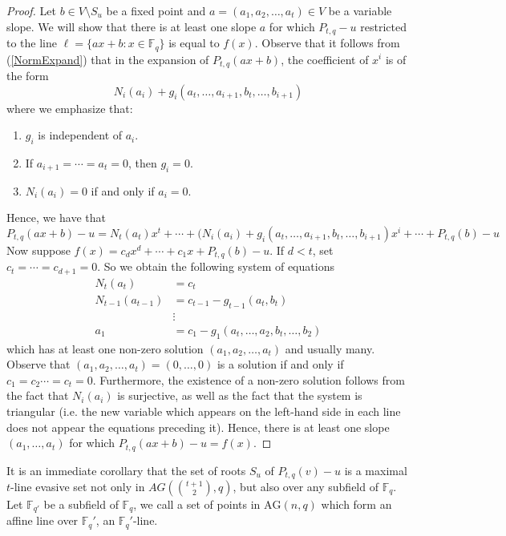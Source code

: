 \documentclass[12pt]{article}
\newcommand{\F}{\mathbb{F}}
\newcommand{\AG}{\text{AG}}
\begin{document}
\begin{proof}
Let $b \in V\setminus S_u$ be a fixed point and $a = (a_1, a_2, \dots, a_t)\in V$ be a variable slope. We will show that there is at least one slope $a$ for which $P_{t, q} - u$ restricted to the line $\ell = \{ax + b : x \in \F_q\}$ is equal to $f(x)$. Observe that it follows from (\ref{NormExpand}) that in the expansion of $P_{t, q}(ax + b)$,  the coefficient of $x^i$ is of the form 
    $$
    N_i(a_i) + g_i(a_{t}, \dots, a_{i + 1}, b_{t}, \dots, b_{i+1})
    $$
    where we emphasize that:
    \begin{enumerate}
        \item $g_i$ is independent of $a_i$.
        \item If $a_{i + 1} = \cdots =a_t = 0$, then $g_i = 0$.
        \item $N_i(a_i) = 0$ if and only if $a_i = 0$.
    \end{enumerate}
    Hence, we have that 
    \begin{equation}\label{Pexpand}
    P_{t, q}(ax + b)-u = N_t(a_t)x^t + \cdots + (N_i(a_i) + g_i(a_{t}, \dots, a_{i + 1}, b_{t}, \dots ,b_{i+1})x^i + \cdots + P_{t, q}(b) - u
    \end{equation}
    Now suppose $f(x) = c_dx^d + \cdots +c_1x + P_{t, q}(b) - u$. If $d < t$, set $c_t = \cdots = c_{d+1} = 0$. So we obtain the following system of equations 
    \begin{align*}
        N_t(a_t) &= c_t \\
        N_{t-1}(a_{t-1}) &= c_{t-1} - g_{t-1}(a_t, b_t) \\
        & \vdots  \\
        a_1 & = c_1 - g_1(a_t, \dots, a_2, b_t, \dots, b_2)
    \end{align*}
    which has at least one non-zero solution $(a_1, a_2, \dots, a_t)$ and usually many. Observe that $(a_1, a_2, \dots, a_t ) = (0, \dots, 0)$ is a solution if and only if $c_1 = c_2 \cdots  = c_t = 0$. Furthermore, the existence of a non-zero solution follows from the fact that $N_i(a_i)$ is surjective, as well as the fact that the system is triangular (i.e. the new variable which appears on the left-hand side in each line does not appear the equations preceding it). Hence, there is at least one slope $(a_1, \dots, a_t)$ for which $P_{t, q}(ax + b) - u = f(x)$.
\end{proof}

It is an immediate corollary that the set of roots $S_u$ of $P_{t, q}(v) - u$ is a maximal $t$-line evasive set not only in $AG(\binom{t+1}{2}, q)$, but also over any subfield of $\F_q$. Let $\F_{q'}$ be a subfield of $\F_q$, we call a set of points in $\AG(n, q)$ which form an affine line over $\F_{q}'$, an $\F_q'$-line. 
\end{document}

